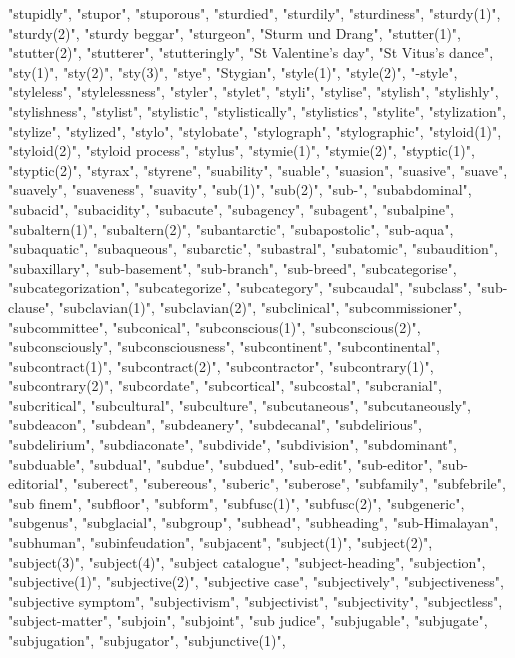 "stupidly",
"stupor",
"stuporous",
"sturdied",
"sturdily",
"sturdiness",
"sturdy(1)",
"sturdy(2)",
"sturdy beggar",
"sturgeon",
"Sturm und Drang",
"stutter(1)",
"stutter(2)",
"stutterer",
"stutteringly",
"St Valentine's day",
"St Vitus's dance",
"sty(1)",
"sty(2)",
"sty(3)",
"stye",
"Stygian",
"style(1)",
"style(2)",
"-style",
"styleless",
"stylelessness",
"styler",
"stylet",
"styli",
"stylise",
"stylish",
"stylishly",
"stylishness",
"stylist",
"stylistic",
"stylistically",
"stylistics",
"stylite",
"stylization",
"stylize",
"stylized",
"stylo",
"stylobate",
"stylograph",
"stylographic",
"styloid(1)",
"styloid(2)",
"styloid process",
"stylus",
"stymie(1)",
"stymie(2)",
"styptic(1)",
"styptic(2)",
"styrax",
"styrene",
"suability",
"suable",
"suasion",
"suasive",
"suave",
"suavely",
"suaveness",
"suavity",
"sub(1)",
"sub(2)",
"sub-",
"subabdominal",
"subacid",
"subacidity",
"subacute",
"subagency",
"subagent",
"subalpine",
"subaltern(1)",
"subaltern(2)",
"subantarctic",
"subapostolic",
"sub-aqua",
"subaquatic",
"subaqueous",
"subarctic",
"subastral",
"subatomic",
"subaudition",
"subaxillary",
"sub-basement",
"sub-branch",
"sub-breed",
"subcategorise",
"subcategorization",
"subcategorize",
"subcategory",
"subcaudal",
"subclass",
"sub-clause",
"subclavian(1)",
"subclavian(2)",
"subclinical",
"subcommissioner",
"subcommittee",
"subconical",
"subconscious(1)",
"subconscious(2)",
"subconsciously",
"subconsciousness",
"subcontinent",
"subcontinental",
"subcontract(1)",
"subcontract(2)",
"subcontractor",
"subcontrary(1)",
"subcontrary(2)",
"subcordate",
"subcortical",
"subcostal",
"subcranial",
"subcritical",
"subcultural",
"subculture",
"subcutaneous",
"subcutaneously",
"subdeacon",
"subdean",
"subdeanery",
"subdecanal",
"subdelirious",
"subdelirium",
"subdiaconate",
"subdivide",
"subdivision",
"subdominant",
"subduable",
"subdual",
"subdue",
"subdued",
"sub-edit",
"sub-editor",
"sub-editorial",
"suberect",
"subereous",
"suberic",
"suberose",
"subfamily",
"subfebrile",
"sub finem",
"subfloor",
"subform",
"subfusc(1)",
"subfusc(2)",
"subgeneric",
"subgenus",
"subglacial",
"subgroup",
"subhead",
"subheading",
"sub-Himalayan",
"subhuman",
"subinfeudation",
"subjacent",
"subject(1)",
"subject(2)",
"subject(3)",
"subject(4)",
"subject catalogue",
"subject-heading",
"subjection",
"subjective(1)",
"subjective(2)",
"subjective case",
"subjectively",
"subjectiveness",
"subjective symptom",
"subjectivism",
"subjectivist",
"subjectivity",
"subjectless",
"subject-matter",
"subjoin",
"subjoint",
"sub judice",
"subjugable",
"subjugate",
"subjugation",
"subjugator",
"subjunctive(1)",

